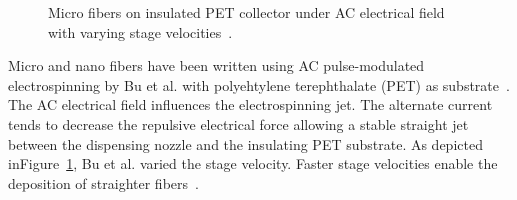 \documentclass[5p,,preprint,12pt,twocolumn]{elsarticle}
\makeatletter
\def\fixFloatSize#1{}%
\makeatother
\begin{document}
\bgroup
\fixFloatSize{images/f684a658-c64f-4f11-ba18-7debcb5e9977-uzheng_00.png}
\begin{figure}[!htbp]
\centering \makeatletter{}
\makeatother 
\caption{{Micro fibers on insulated PET collector under AC electrical field with varying stage velocities\unskip~\protect\cite{527120:11974304}.}}
\label{f-b2c382d8b6ab}
\end{figure}
\egroup
Micro and nano fibers have been written using AC pulse-modulated electrospinning by Bu et al. with polyehtylene terephthalate (PET) as substrate\unskip~\cite{527120:11974304}. The AC electrical field influences the electrospinning jet. The alternate current tends to decrease the repulsive electrical force allowing a stable straight jet between the dispensing nozzle and the insulating PET substrate. As depicted inFigure~\ref{f-b2c382d8b6ab}, Bu et al. varied the stage velocity. Faster stage velocities enable the deposition of straighter fibers\unskip~\cite{527120:11974304}.
\end{document}
